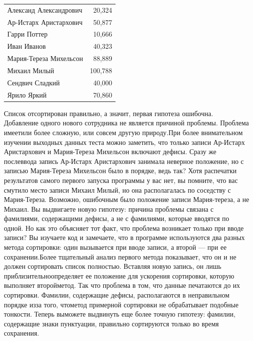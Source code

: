 \documentclass[a4paper]{article}
\begin{document}
\begin{tabular}{lr}
Александ Александрович & 20,324 \\
Ар-Истарх Аристархович  &   50,877 \\
Гарри Поттер               &   10,666 \\
Иван Иванов           & 40,323\\
Мария-Тереза Михельсон           &   88,889 \\
Михаил Милый           &  100,788 \\
Сендвич Сладкий      &   40,000 \\
Ярило Яркий           &   70,860 \\
\end{tabular}

Список  отсортирован  правильно,  а  значит,  первая  гипотеза  ошибочна.  Добавление одного нового сотрудника не является причиной проблемы. Проблема имеетили  более  сложную,  или  совсем  другую  природу.При  более  внимательном  изучении  выходных  данных  теста  можно  заметить,  что только записи Ар-Истарх Аристархович и Мария-Тереза Михельсон включают дефисы. Сразу же послеввода  запись Ар-Истарх Аристархович  занимала  неверное  положение,  но  с  записью  Мария-Тереза Михельсон  было  в  порядке,  ведь  так?  Хотя  распечатки  результатов  самого  первого  запуска программы у вас нет, вы помните, что вас смутило место записи Михаил Милый, но  она  располагалась  по  соседству  с Мария-Тереза.  Возможно,  ошибочным  было положение  записи  Мария-тереза,  а  не  Михаил. Вы  выдвигаете  новую  гипотезу:  причина  проблемы  связана  с  фамилиями,  содержащими  дефисы,  а  не  с  фамилиями,  которые  вводятся  по  одной. Но как это объясняет тот факт, что проблема возникает только при вводе записи? Вы  изучаете  код  и  замечаете,  что  в  программе  используются  два  разных  метода сортировки:  один  вызывается  при  вводе  записи,  а  второй  —  при  ее  сохранении.Более  тщательный  анализ  первого  метода  показывает,  что  он  и  не  должен  сортировать  список  полностью.  Вставляя  новую  запись,  он  лишь  приблизительноопределяет  ее  положение  для  ускорения  сортировки,  которую  выполняет  второйметод.  Так  что  проблема  в  том,  что  данные  печатаются  до  их  сортировки.  Фамилии,  содержащие  дефисы,  располагаются  в  неправильном  порядке  изза  того,  чтометод  примерной  сортировки  не  обрабатывает  подобные  тонкости.  Теперь  выможете  выдвинуть  еще  более  точную  гипотезу:  фамилии,  содержащие  знаки  пунктуации,  правильно  сортируются  только  во  время  сохранения.
\end{document}
